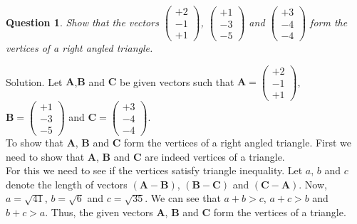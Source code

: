 \documentclass{article}
\newtheorem{question}[theorem]{Question}
\newcommand{\vect}[1]{\boldsymbol{#1}}
\begin{document}
\begin{question}
	Show that the vectors $\begin{pmatrix} 
		 +2\\-1\\+1 
	\end{pmatrix}$, $\begin{pmatrix} 
	 +1\\-3\\-5 
\end{pmatrix}$ and $\begin{pmatrix} 
+3\\-4\\-4 
\end{pmatrix}$ form the vertices of a right angled triangle.
\end{question}
Solution. Let $\vect{A}$,$\vect{B}$  and $\vect{C}$ be given vectors such that $\vect{A} =\begin{pmatrix} 
	+2\\-1\\+1 
\end{pmatrix}$,\\     
$\vect{B}= \begin{pmatrix} 
+1\\-3\\-5 
\end{pmatrix}$ and $\vect{C}= \begin{pmatrix} 
+3\\-4\\-4 
\end{pmatrix}$.\\
To show that $\vect{A}$, $\vect{B}$ and $\vect{C}$ form the vertices of a right angled triangle. First we need to show that $\vect{A}$, $\vect{B}$ and $\vect{C}$ are indeed vertices of a triangle.\\
For this we need to see if the vertices satisfy triangle inequality. Let $a$, $b$ and $c$ denote the length of vectors $(\vect{A}- \vect{B})$, $(\vect{B}-\vect{C})$ and $(\vect{C}- \vect{A})$. Now,\\
$a=\sqrt{41}$, $b=\sqrt{6}$ and $c=\sqrt{35}$. We can see that  $a+b>c$, 
$a+c>b$ and $b+c >a$. Thus, the given vectors $\vect{A}$, $\vect{B}$ and $\vect{C}$ form the vertices of a triangle.\\
\end{document}
